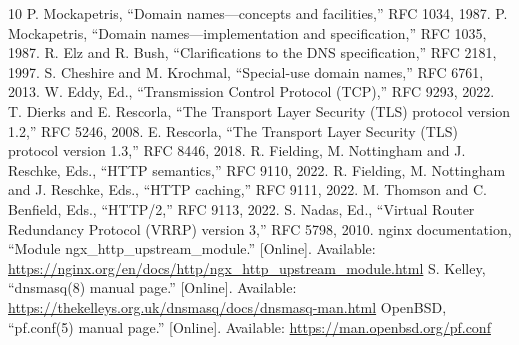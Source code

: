 \documentclass[conference]{IEEEtran}
\begin{document}
\begin{thebibliography}{10}
 P. Mockapetris, ``Domain names---concepts and facilities,'' RFC 1034, 1987.
 P. Mockapetris, ``Domain names---implementation and specification,'' RFC 1035, 1987.
 R. Elz and R. Bush, ``Clarifications to the DNS specification,'' RFC 2181, 1997.
 S. Cheshire and M. Krochmal, ``Special-use domain names,'' RFC 6761, 2013.
 W. Eddy, Ed., ``Transmission Control Protocol (TCP),'' RFC 9293, 2022.
 T. Dierks and E. Rescorla, ``The Transport Layer Security (TLS) protocol version 1.2,'' RFC 5246, 2008.
 E. Rescorla, ``The Transport Layer Security (TLS) protocol version 1.3,'' RFC 8446, 2018.
 R. Fielding, M. Nottingham and J. Reschke, Eds., ``HTTP semantics,'' RFC 9110, 2022.
 R. Fielding, M. Nottingham and J. Reschke, Eds., ``HTTP caching,'' RFC 9111, 2022.
 M. Thomson and C. Benfield, Eds., ``HTTP/2,'' RFC 9113, 2022.
 S. Nadas, Ed., ``Virtual Router Redundancy Protocol (VRRP) version 3,'' RFC 5798, 2010.
 nginx documentation, ``Module ngx\_http\_upstream\_module.'' [Online]. Available: \url{https://nginx.org/en/docs/http/ngx_http_upstream_module.html}
 S. Kelley, ``dnsmasq(8) manual page.'' [Online]. Available: \url{https://thekelleys.org.uk/dnsmasq/docs/dnsmasq-man.html}
 OpenBSD, ``pf.conf(5) manual page.'' [Online]. Available: \url{https://man.openbsd.org/pf.conf}
\end{thebibliography}
\end{document}
